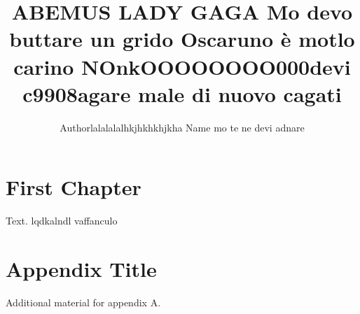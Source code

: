 \documentclass[11pt,a4paper,openright]{book}
\title{ABEMUS LADY GAGA Mo devo buttare un grido Oscaruno è motlo carino NOnkOOOOOOOO000devi c9908agare male di nuovo cagati}
\author{Authorlalalalalhkjhkhkhjkha Name mo te ne devi adnare}
\date{}
\begin{document}
\maketitle
\tableofcontents


\chapter{First Chapter}
Text.  lqdkalndl vaffanculo
\cite{doe2025sample} 


\appendix
\chapter{Appendix Title}
Additional material for appendix A.





\end{document}
